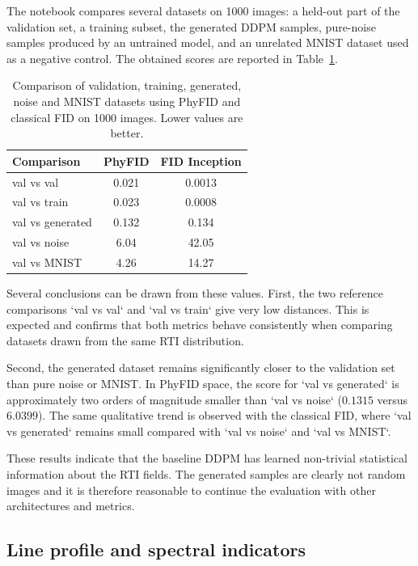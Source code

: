 The notebook compares several datasets on 1000 images: a held-out part of the
validation set, a training subset, the generated DDPM samples, pure-noise
samples produced by an untrained model, and an unrelated MNIST dataset used as
a negative control. The obtained scores are reported in
Table~\ref{tab:fid_phyfid_baseline}.

\begin{table}[H]
    \centering
    \begin{tabular}{lcc}
        \hline
        Comparison & PhyFID & FID Inception \\
        \hline
        val vs val & 0.021 & 0.0013 \\
        val vs train & 0.023 & 0.0008 \\
        val vs generated & 0.132 & 0.134 \\
        val vs noise & 6.04 & 42.05 \\
        val vs MNIST & 4.26 & 14.27 \\
        \hline
    \end{tabular}
    \caption{Comparison of validation, training, generated, noise and MNIST
    datasets using PhyFID and classical FID on 1000 images. Lower values are
    better.}
    \label{tab:fid_phyfid_baseline}
\end{table}

Several conclusions can be drawn from these values. First, the two reference
comparisons `val vs val` and `val vs train` give very low distances. This is
expected and confirms that both metrics behave consistently when comparing
datasets drawn from the same RTI distribution.

Second, the generated dataset remains significantly closer to the validation
set than pure noise or MNIST. In PhyFID space, the score for `val vs generated`
is approximately two orders of magnitude smaller than `val vs noise`
($0.1315$ versus $6.0399$). The same qualitative trend is observed with the
classical FID, where `val vs generated` remains small compared with
`val vs noise` and `val vs MNIST`.

These results indicate that the baseline DDPM has learned non-trivial
statistical information about the RTI fields. The generated samples are clearly
not random images and it is therefore reasonable to continue the evaluation with 
other architectures and metrics.

\subsection{Line profile and spectral indicators}

